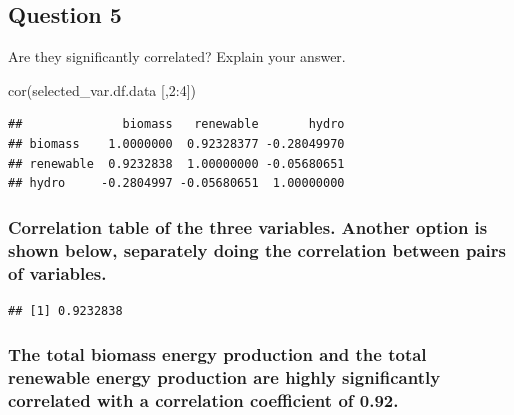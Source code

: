 \documentclass[
]{article}
\newenvironment{Shaded}{\begin{snugshade}}{\end{snugshade}}
\newcommand{\DecValTok}[1]{\textcolor[rgb]{0.00,0.00,0.81}{#1}}
\newcommand{\FunctionTok}[1]{\textcolor[rgb]{0.00,0.00,0.00}{#1}}
\newcommand{\NormalTok}[1]{#1}
\newcommand{\SpecialCharTok}[1]{\textcolor[rgb]{0.00,0.00,0.00}{#1}}
\begin{document}
\hypertarget{question-5}{%
\subsection{Question 5}\label{question-5}}

Are they significantly correlated? Explain your answer.

\begin{Shaded}
\begin{Highlighting}[]
\FunctionTok{cor}\NormalTok{(selected\_var.df.data [,}\DecValTok{2}\SpecialCharTok{:}\DecValTok{4}\NormalTok{])  }
\end{Highlighting}
\end{Shaded}

\begin{verbatim}
##              biomass   renewable       hydro
## biomass    1.0000000  0.92328377 -0.28049970
## renewable  0.9232838  1.00000000 -0.05680651
## hydro     -0.2804997 -0.05680651  1.00000000
\end{verbatim}

\hypertarget{correlation-table-of-the-three-variables.-another-option-is-shown-below-separately-doing-the-correlation-between-pairs-of-variables.}{%
\subsubsection{Correlation table of the three variables. Another option
is shown below, separately doing the correlation between pairs of
variables.}\label{correlation-table-of-the-three-variables.-another-option-is-shown-below-separately-doing-the-correlation-between-pairs-of-variables.}}

\begin{Shaded}
\end{Shaded}

\begin{verbatim}
## [1] 0.9232838
\end{verbatim}

\hypertarget{the-total-biomass-energy-production-and-the-total-renewable-energy-production-are-highly-significantly-correlated-with-a-correlation-coefficient-of-0.92.}{%
\subsubsection{The total biomass energy production and the total
renewable energy production are highly significantly correlated with a
correlation coefficient of
0.92.}\label{the-total-biomass-energy-production-and-the-total-renewable-energy-production-are-highly-significantly-correlated-with-a-correlation-coefficient-of-0.92.}}
\end{document}
